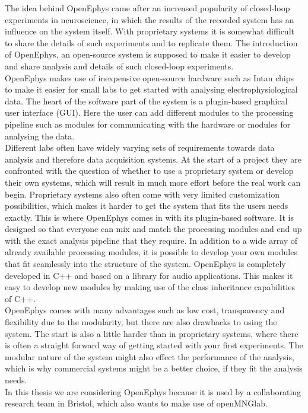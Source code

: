 The idea behind OpenEphys came after an increased popularity of closed-loop experiments in neuroscience, in which the results of the recorded system has an influence on the system itself. With proprietary systems it is somewhat difficult to share the details of such experiments and to replicate them. The introduction of OpenEphys, an open-source system is supposed to make it easier to develop and share analysis and details of such closed-loop experiments.\\
OpenEphys makes use of inexpensive open-source hardware such as Intan chips to make it easier for small labs to get started with analysing electrophysiological data. The heart of the software part of the system is a plugin-based graphical user interface (GUI). Here the user can add different modules to the processing pipeline such as modules for communicating with the hardware or modules for analysing the data.\\
Different labs often have widely varying sets of requirements towards data analysis and therefore data acquisition systems. At the start of a project they are confronted with the question of whether to use a proprietary system or develop their own systems, which will result in much more effort before the real work can begin. Proprietary systems also often come with very limited customization possibilities, which makes it harder to get the system that fits the users needs exactly. This is where OpenEphys comes in with its plugin-based software. It is designed so that everyone can mix and match the processing modules and end up with the exact analysis pipeline that they require. In addition to a wide array of already available processing modules, it is possible to develop your own modules that fit seamlessly into the structure of the system. OpenEphys is completely developed in C++ and based on a library for audio applications. This makes it easy to develop new modules by making use of the class inheritance capabilities of C++.\\
OpenEphys comes with many advantages such as low cost, transparency and flexibility due to the modularity, but there are also drawbacks to using the system. The start is also a little harder than in proprietary systems, where there is often a straight forward way of getting started with your first experiments. The modular nature of the system might also effect the performance of the analysis, which is why commercial systems might be a better choice, if they fit the analysis needs.\\

In this thesis we are considering OpenEphys because it is used by a collaborating research team in Bristol, which also wants to make use of openMNGlab.



 
\cleardoublepage
